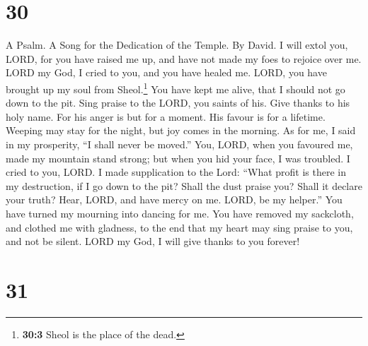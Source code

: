 \hypertarget{section-29}{%
\section{30}\label{section-29}}

A Psalm. A Song for the Dedication of the Temple. By David.
 I will extol you, LORD, for you have raised me up, and
have not made my foes to rejoice over me.  LORD my God, I
cried to you, and you have healed me.  LORD, you have
brought up my soul from Sheol.\footnote{\textbf{30:3} Sheol is the place
  of the dead.} You have kept me alive, that I should not go down to the
pit.  Sing praise to the LORD, you saints of his. Give
thanks to his holy name.  For his anger is but for a
moment. His favour is for a lifetime. Weeping may stay for the night,
but joy comes in the morning.  As for me, I said in my
prosperity, ``I shall never be moved.''  You, LORD, when
you favoured me, made my mountain stand strong; but when you hid your
face, I was troubled.  I cried to you, LORD. I made
supplication to the Lord:  ``What profit is there in my
destruction, if I go down to the pit? Shall the dust praise you? Shall
it declare your truth?  Hear, LORD, and have mercy on me.
LORD, be my helper.''  You have turned my mourning into
dancing for me. You have removed my sackcloth, and clothed me with
gladness,  to the end that my heart may sing praise to
you, and not be silent. LORD my God, I will give thanks to you forever!

\hypertarget{section-30}{%
\section{31}\label{section-30}}

